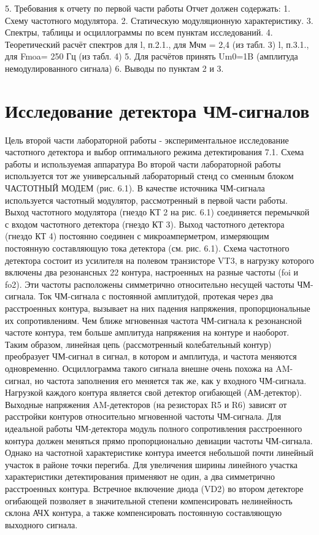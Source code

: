 ﻿\documentclass[a4paper,12pt]{article}
\begin{document}
5.	Требования к отчету по первой части работы
Отчет должен содержать:
1.	Схему частотного модулятора.
2.	Статическую модуляционную характеристику.
3.	Спектры, таблицы и осциллограммы по всем пунктам исследований.
4.	Теоретический расчёт спектров для
l,	п.2.1., для Мчм = 2,4 (из табл. 3)
l, п.3.1., для Fmoa= 250 Гц (из табл. 4)
5.	Для расчётов принять Um0=1B (амплитуда немодулированного сигнала)
6.	Выводы по пунктам 2 и 3.

\section{Исследование детектора ЧМ-сигналов}
Цель второй части лабораторной работы - экспериментальное исследование частотного детектора и выбор оптимального режима детектирования
7.1.	Схема работы и используемая аппаратура
Во второй части лабораторной работы используется тот же универсальный лабораторный стенд со сменным блоком ЧАСТОТНЫЙ МОДЕМ (рис. 6.1). В качестве источника ЧМ-сигнала используется частотный модулятор, рассмотренный в первой части работы. Выход частотного модулятора (гнездо КТ 2 на рис. 6.1) соединяется перемычкой с входом частотного детектора (гнездо КТ 3). Выход частотного детектора (гнездо КТ 4) постоянно соединен с микроамперметром, измеряющим постоянную составляющую тока детектора (см. рис. 6.1). Схема частотного детектора состоит из усилителя на полевом транзисторе VT3, в нагрузку которого включены два резонансных
22
контура, настроенных на разные частоты (foi и fo2). Эти частоты расположены симметрично относительно несущей частоты ЧМ-сигнала. Ток ЧМ-сигнала с постоянной амплитудой, протекая через два расстроенных контура, вызывает на них падения напряжения, пропорциональные их сопротивлениям. Чем ближе мгновенная частота ЧМ-сигнала к резонансной частоте контура, тем больше амплитуда напряжения на контуре и наоборот. Таким образом, линейная цепь (рассмотренный колебательный контур) преобразует ЧМ-сигнал в сигнал, в котором и амплитуда, и частота меняются одновременно. Осциллограмма такого сигнала внешне очень похожа на AM-сигнал, но частота заполнения его меняется так же, как у входного ЧМ-сигнала. Нагрузкой каждого контура является свой детектор огибающей (АМ-детектор).
Выходные напряжения AM-детекторов (на резисторах R5 и R6) зависят от расстройки контуров относительно мгновенной частоты ЧМ-сигнала. Для идеальной работы ЧМ-детектора модуль полного сопротивления расстроенного контура должен меняться прямо пропорционально девиации частоты ЧМ-сигнала. Однако на частотной характеристике контура имеется небольшой почти линейный участок в районе точки перегиба. Для увеличения ширины линейного участка характеристики детектирования применяют не один, а два симметрично расстроенных контура. Встречное включение диода (VD2) во втором детекторе огибающей позволяет в значительной степени компенсировать нелинейность склона АЧХ контура, а также компенсировать постоянную составляющую выходного сигнала.
\end{document}

